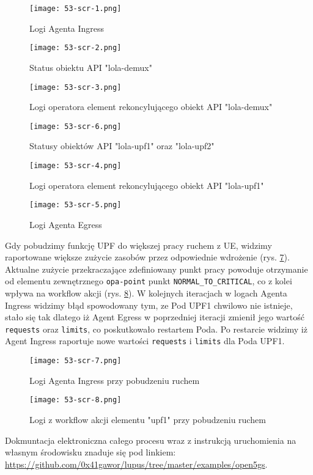 \begin{figure}[!h]
    \centering \texttt{[image: 53-scr-1.png]}
    \caption{Logi Agenta Ingress}\label{fig:53-scr-1}
\end{figure}

\begin{figure}[!h]
    \centering \texttt{[image: 53-scr-2.png]}
    \caption{Status obiektu API "lola-demux"}\label{fig:53-scr-2}
\end{figure}

\begin{figure}[!h]
    \centering \texttt{[image: 53-scr-3.png]}
    \caption{Logi operatora element rekoncylującego obiekt API "lola-demux"}\label{fig:53-scr-3}
\end{figure}

\begin{figure}[!h]
    \centering \texttt{[image: 53-scr-6.png]}
    \caption{Statusy obiektów API "lola-upf1" oraz "lola-upf2"}\label{fig:53-scr-6}
\end{figure}

\begin{figure}[!h]
    \centering \texttt{[image: 53-scr-4.png]}
    \caption{Logi operatora element rekoncylującego obiekt API "lola-upf1"}\label{fig:53-scr-4}
\end{figure}

\begin{figure}[!h]
    \centering \texttt{[image: 53-scr-5.png]}
    \caption{Logi Agenta Egress}\label{fig:53-scr-5}
\end{figure}

Gdy pobudzimy funkcję UPF do większej pracy ruchem z UE, widzimy raportowane większe zużycie zasobów przez odpowiednie wdrożenie (rys. \ref{fig:53-scr-7}). Aktualne zużycie przekraczające zdefiniowany punkt pracy powoduje otrzymanie od elementu zewnętrznego \texttt{opa-point} punkt \texttt{NORMAL\_TO\_CRITICAL}, co z kolei wpływa na workflow akcji (rys. \ref{fig:53-scr-8}). W kolejnych iteracjach w logach Agenta Ingress widzimy błąd spowodowany tym, ze Pod UPF1 chwilowo nie istnieje, stało się tak dlatego iż Agent Egress w poprzedniej iteracji zmienił jego wartość \texttt{requests} oraz \texttt{limits}, co poskutkowało restartem Poda. Po restarcie widzimy iż Agent Ingress raportuje nowe wartości \texttt{requests} i \texttt{limits} dla Poda UPF1.

\begin{figure}[!h]
    \centering \texttt{[image: 53-scr-7.png]}
    \caption{Logi Agenta Ingress przy pobudzeniu ruchem}\label{fig:53-scr-7}
\end{figure}

\begin{figure}[!h]
    \centering \texttt{[image: 53-scr-8.png]}
    \caption{Logi z workflow akcji elementu "upf1" przy pobudzeniu ruchem}\label{fig:53-scr-8}
\end{figure}

Dokmuntacja elektroniczna całego procesu wraz z instrukcją uruchomienia na własnym środowisku znaduje się pod linkiem: \url{https://github.com/0x41gawor/lupus/tree/master/examples/open5gs}.